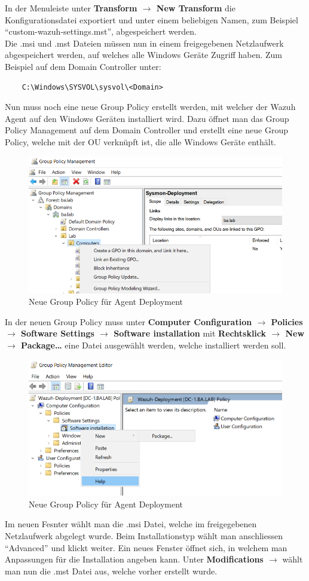 In der Menuleiste unter \textbf{Transform $\rightarrow$ New Transform} die Konfigurationsdatei exportiert und unter einem beliebigen Namen, zum Beispiel ``custom-wazuh-settings.mst'', abgespeichert werden.\\

Die .msi und .mst Dateien müssen nun in einem freigegebenen Netzlaufwerk abgespeichert werden, auf welches alle Windows Geräte Zugriff haben. Zum Beispiel auf dem Domain Controller unter:
\begin{lstlisting}
    C:\Windows\SYSVOL\sysvol\<Domain>
\end{lstlisting}

Nun muss noch eine neue Group Policy erstellt werden, mit welcher der Wazuh Agent auf den Windows Geräten installiert wird.
Dazu öffnet man das Group Policy Management auf dem Domain Controller und erstellt eine neue Group Policy, welche mit der OU verknüpft ist, die alle Windows Geräte enthält.
\begin{figure}[H]
    \centering
    \includegraphics[width=0.7\linewidth]{../img/agent/create-new-group-policy.png}
    \caption{Neue Group Policy für Agent Deployment}
\end{figure}

In der neuen Group Policy muss unter \textbf{Computer Configuration $\rightarrow$ Policies $\rightarrow$ Software Settings $\rightarrow$ Software installation} mit \textbf{Rechtsklick $\rightarrow$ New $\rightarrow$ Package\dots} eine Datei ausgewählt werden, welche installiert werden soll.

\begin{figure}[H]
    \centering
    \includegraphics[width=0.7\linewidth]{../img/agent/new-software-install.png}
    \caption{Neue Group Policy für Agent Deployment}
\end{figure}
Im neuen Fesnter wählt man die .msi Datei, welche im freigegebenen Netzlaufwerk abgelegt wurde.
Beim Installationstyp wählt man anschliessen ``Advanced'' und klickt weiter.
Ein neues Fenster öffnet sich, in welchem man Anpassungen für die Installation angeben kann.
Unter \textbf{Modifications $\rightarrow$} wählt man nun die .mst Datei aus, welche vorher erstellt wurde.\\


